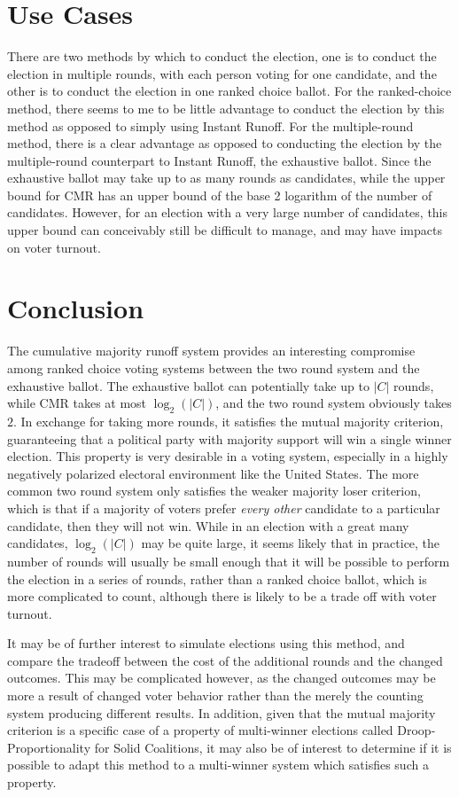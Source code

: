 \documentclass{article}
\begin{document}
\section{Use Cases}
There are two methods by which to conduct the election, one is to conduct the election in multiple rounds, with each person voting for one candidate, and the other is to conduct the election in one ranked choice ballot. For the ranked-choice method, there seems to me to be little advantage to conduct the election by this method as opposed to simply using Instant Runoff. For the multiple-round method, there is a clear advantage as opposed to conducting the election by the multiple-round counterpart to Instant Runoff, the exhaustive ballot. Since the exhaustive ballot may take up to as many rounds as candidates, while the upper bound for CMR has an upper bound of the base 2 logarithm of the number of candidates. However, for an election with a very large number of candidates, this upper bound can conceivably still be difficult to manage, and may have impacts on voter turnout.

\section{Conclusion}
The cumulative majority runoff system provides an interesting compromise among ranked choice voting systems between the two round system and the exhaustive ballot. The exhaustive ballot can potentially take up to $|C|$ rounds, while CMR takes at most $\log_2(|C|)$, and the two round system obviously takes $2$. In exchange for taking more rounds, it satisfies the mutual majority criterion, guaranteeing that a political party with majority support will win a single winner election. This property is very desirable in a voting system, especially in a highly negatively polarized electoral environment like the United States. The more common two round system only satisfies the weaker majority loser criterion, which is that if a majority of voters prefer \emph{every other} candidate to a particular candidate, then they will not win. While in an election with a great many candidates, $\log_2(|C|)$ may be quite large, it seems likely that in practice, the number of rounds will usually be small enough that it will be possible to perform the election in a series of rounds, rather than a ranked choice ballot, which is more complicated to count, although there is likely to be a trade off with voter turnout.

It may be of further interest to simulate elections using this method, and compare the tradeoff between the cost of the additional rounds and the changed outcomes. This may be complicated however, as the changed outcomes may be more a result of changed voter behavior rather than the merely the counting system producing different results. In addition, given that the mutual majority criterion is a specific case of a property of multi-winner elections called Droop-Proportionality for Solid Coalitions, it may also be of interest to determine if it is possible to adapt this method to a multi-winner system which satisfies such a property.

\printbibliography
\end{document}
